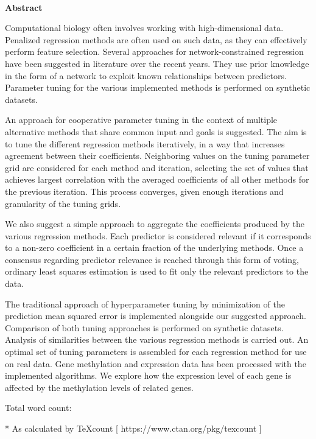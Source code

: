 \newpage
\begin{center}
	\LARGE
	\dissertationtitle \\
\end{center}

{\Huge \bf Abstract}
\vspace{24pt} 

Computational biology often involves working with high-dimensional data. Penalized regression methods are often used on such data, as they can effectively perform feature selection. Several approaches for network-constrained regression have been suggested in literature over the recent years. They use prior knowledge in the form of a network to exploit known relationships between predictors. Parameter tuning for the various implemented methods is performed on synthetic datasets. 

An approach for cooperative parameter tuning in the context of multiple alternative methods that share common input and goals is suggested. The aim is to tune the different regression methods iteratively, in a way that increases agreement between their coefficients. Neighboring values on the tuning parameter grid are considered for each method and iteration, selecting the set of values that achieves largest correlation with the averaged coefficients of all other methods for the previous iteration. This process converges, given enough iterations and granularity of the tuning grids.

We also suggest a simple approach to aggregate the coefficients produced by the various regression methods. Each predictor is considered relevant if it corresponds to a non-zero coefficient in a certain fraction of the underlying methods. Once a consensus regarding predictor relevance is reached through this form of voting, ordinary least squares estimation is used to fit only the relevant predictors to the data.

The traditional approach of hyperparameter tuning by minimization of the prediction mean squared error is implemented alongside our suggested approach. Comparison of both tuning approaches is performed on synthetic datasets. Analysis of similarities between the various regression methods is carried out. An optimal set of tuning parameters is assembled for each regression method for use on real data. Gene methylation and expression data has been processed with the implemented algorithms. We explore how the expression level of each gene is affected by the methylation levels of related genes.

\newpage
Total word count: \wordcount

* As calculated by TeXcount [ https://www.ctan.org/pkg/texcount ]
\vspace*{\fill}
